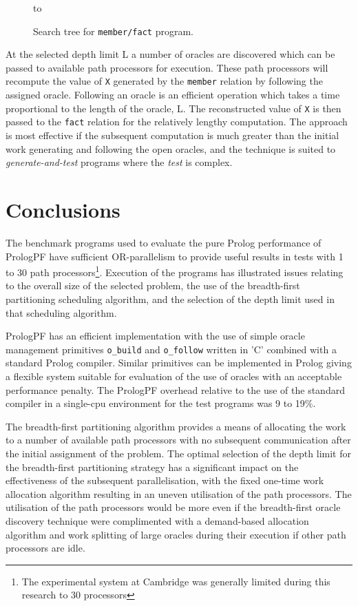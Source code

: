 \begin{figure}[htbp]
\vspace{5mm} \hbox to 
\caption{Search tree for \texttt{member/fact} program.}
\vspace{5mm}
\label{stream_and}
\end{figure}

At the selected depth limit L a number of oracles are discovered which can be passed
to available path processors for execution.  These path processors will recompute the
value of \texttt{X} generated by the \texttt{member} relation by following the
assigned oracle.  Following an oracle is an efficient operation which takes a time
proportional to the length of the oracle, L.  The reconstructed value of \texttt{X}
is then passed to the \texttt{fact} relation for the relatively lengthy computation.
The approach is most effective if the subsequent computation is much greater than
the initial work generating and following the open oracles, and the technique is
suited to \textit{generate-and-test} programs where the \textit{test} is complex.

\section{Conclusions} %

The benchmark programs used to evaluate the pure Prolog performance of PrologPF
have sufficient OR-parallelism to provide useful results in tests with 1 to
30 path processors\footnote{The experimental system at Cambridge was generally limited during
this research to 30 processors}.
Execution of the programs has illustrated issues relating to
the overall size of the selected problem, the use of the breadth-first partitioning
scheduling algorithm, and the selection of the depth limit used in that
scheduling algorithm.

PrologPF has an efficient implementation with the use of simple oracle
management primitives \texttt{o\_{}build} and \texttt{o\_{}follow} 
written in 'C' combined with a standard Prolog compiler.  Similar
primitives can be implemented in Prolog giving a flexible system
suitable for evaluation of the use of oracles with an acceptable
performance penalty.  The PrologPF overhead relative to the use of the standard compiler
in a single-cpu environment for the test programs was 9 to 19\%.

The breadth-first partitioning algorithm provides a means of allocating the work
to a number of available path processors with no subsequent communication after
the initial assignment of the problem.  The optimal selection of the depth limit
for the breadth-first partitioning strategy has a significant impact on the
effectiveness of the subsequent parallelisation, with the fixed one-time work
allocation algorithm resulting in an uneven utilisation of the path processors.
The utilisation of the path processors would be more even if the breadth-first
oracle discovery technique were complimented with a demand-based allocation
algorithm and work splitting of large oracles during their execution if other path
processors are idle.

